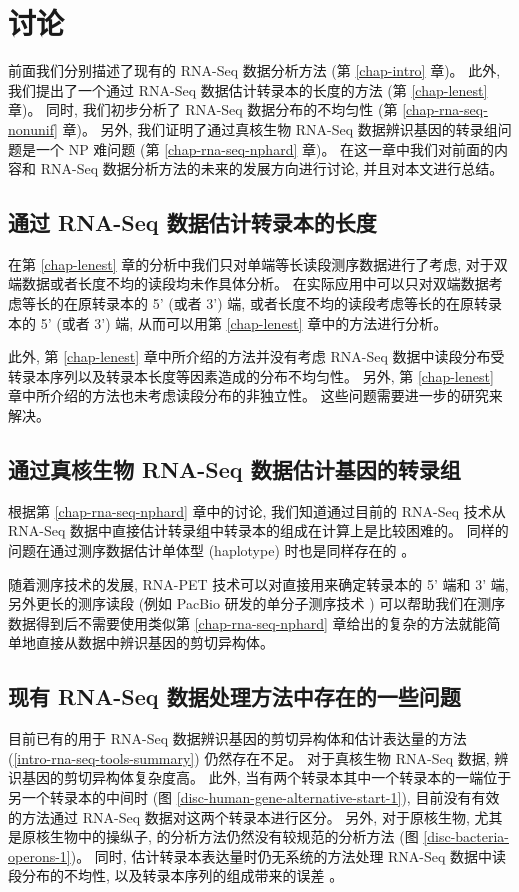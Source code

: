 \chapter{讨论}
前面我们分别描述了现有的 RNA-Seq 数据分析方法 (第 \ref{chap-intro} 章)。 
此外, 我们提出了一个通过 RNA-Seq 数据估计转录本的长度的方法 (第 \ref{chap-lenest} 章)。  
同时, 我们初步分析了 RNA-Seq 数据分布的不均匀性 (第 \ref{chap-rna-seq-nonunif} 章)。  
另外, 我们证明了通过真核生物 RNA-Seq 数据辨识基因的转录组问题是一个 NP 难问题 (第 \ref{chap-rna-seq-nphard} 章)。   
在这一章中我们对前面的内容和 RNA-Seq 数据分析方法的未来的发展方向进行讨论, 
并且对本文进行总结。 

\section{通过 RNA-Seq 数据估计转录本的长度}
在第 \ref{chap-lenest} 章的分析中我们只对单端等长读段测序数据进行了考虑, 
对于双端数据或者长度不均的读段均未作具体分析。 
在实际应用中可以只对双端数据考虑等长的在原转录本的 5' (或者 3') 端, 
或者长度不均的读段考虑等长的在原转录本的 5' (或者 3') 端, 
从而可以用第 \ref{chap-lenest} 章中的方法进行分析。 

此外, 第 \ref{chap-lenest} 章中所介绍的方法并没有考虑 RNA-Seq 
数据中读段分布受转录本序列以及转录本长度等因素造成的分布不均匀性。 
另外, 第 \ref{chap-lenest} 章中所介绍的方法也未考虑读段分布的非独立性。 
这些问题需要进一步的研究来解决。 

\section{通过真核生物 RNA-Seq 数据估计基因的转录组}
根据第 \ref{chap-rna-seq-nphard} 章中的讨论, 
我们知道通过目前的 RNA-Seq 技术从 RNA-Seq 数据中直接估计转录组中转录本的组成在计算上是比较困难的。 
同样的问题在通过测序数据估计单体型 (haplotype) 
\cite{Li_Kim_Waterman_2004, Xing_Jordan_Sharan_2007} 时也是同样存在的 \cite{1668028}。 

随着测序技术的发展, 
RNA-PET \cite{Fullwood01042009} 技术可以对直接用来确定转录本的 5' 端和 3' 端, 
另外更长的测序读段 (例如 PacBio 研发的单分子测序技术 \cite{hybrid.rna.seq.2012})
可以帮助我们在测序数据得到后不需要使用类似第 \ref{chap-rna-seq-nphard} 
章给出的复杂的方法就能简单地直接从数据中辨识基因的剪切异构体。 

\section{现有 RNA-Seq 数据处理方法中存在的一些问题}
目前已有的用于 RNA-Seq 数据辨识基因的剪切异构体和估计表达量的方法 
(\ref{intro-rna-seq-tools-summary}) 仍然存在不足。 
对于真核生物 RNA-Seq 数据, 辨识基因的剪切异构体复杂度高。
此外, 当有两个转录本其中一个转录本的一端位于另一个转录本的中间时 
(图 \ref{disc-human-gene-alternative-start-1}), 
目前没有有效的方法通过 RNA-Seq 数据对这两个转录本进行区分。
另外, 对于原核生物, 尤其是原核生物中的操纵子, 的分析方法仍然没有较规范的分析方法 
\cite{mcclure2013computational} (图 \ref{disc-bacteria-operons-1})。
同时, 估计转录本表达量时仍无系统的方法处理 RNA-Seq 数据中读段分布的不均性, 
以及转录本序列的组成带来的误差 \cite{oshlack2009transcript, jones2012new}。

